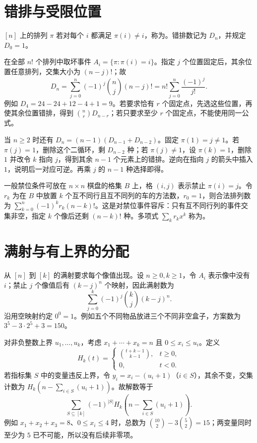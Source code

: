 \documentclass[UTF8,12pt,a4paper,fontset=fandol]{ctexbook}
\begin{document}
\section{错排与受限位置}

\begin{definition}
$[n]$ 上的排列 $\pi$ 若对每个 $i$ 都满足 $\pi(i)\ne i$，称为。错排数记为 $D_n$，并规定 $D_0=1$。
\end{definition}

在全部 $n!$ 个排列中取坏事件 $A_i=\{\pi:\pi(i)=i\}$。指定 $j$ 个位置固定后，其余位置任意排列，交集大小为 $(n-j)!$；故
\begin{equation}
  D_n=\sum_{j=0}^n(-1)^j\binom nj(n-j)!
      =n!\sum_{j=0}^n\frac{(-1)^j}{j!}.
  \label{eq:derangements}
\end{equation}
例如 $D_4=24-24+12-4+1=9$。若要求恰有 $r$ 个固定点，先选这些位置，再使其余位置错排，得到 $\binom nrD_{n-r}$；若只要求至少 $r$ 个固定点，不能使用同一公式。

当 $n\ge2$ 时还有 $D_n=(n-1)(D_{n-1}+D_{n-2})$。固定 $\pi(1)=j\ne1$。若 $\pi(j)=1$，删除这个二循环，剩 $D_{n-2}$ 种；若 $\pi(j)\ne1$，设 $\pi(k)=1$，删除 $1$ 并改令 $k$ 指向 $j$，得到其余 $n-1$ 个元素上的错排。逆向在指向 $j$ 的箭头中插入 $1$，说明后一对应可逆。再乘 $j$ 的 $n-1$ 种选择即得。

一般禁位条件可放在 $n\times n$ 棋盘的格集 $B$ 上，格 $(i,j)$ 表示禁止 $\pi(i)=j$。令 $r_k$ 为在 $B$ 中放置 $k$ 个互不同行且互不同列的车的方法数，$r_0=1$，则合法排列数为 $\sum_{k=0}^n(-1)^k r_k(n-k)!$。这是对禁位事件容斥：只有互不同行列的事件交集非空，指定 $k$ 个像后还剩 $(n-k)!$ 种。多项式 $\sum_k r_kx^k$ 称为。

\section{满射与有上界的分配}

从 $[n]$ 到 $[k]$ 的满射要求每个像值出现。设 $n\ge0,k\ge1$，令 $A_i$ 表示像中没有 $i$；禁止 $j$ 个像值后有 $(k-j)^n$ 个映射，因此满射数为
\[
  \sum_{j=0}^k(-1)^j\binom kj(k-j)^n.
\]
沿用空映射约定 $0^0=1$。例如五个不同物品放进三个不同非空盒子，方案数为 $3^5-3\cdot2^5+3=150$。

对非负整数上界 $u_1,\ldots,u_k$，考虑 $x_1+\cdots+x_k=n$ 且 $0\le x_i\le u_i$。定义
\[
  H_k(t)=\begin{cases}\binom{t+k-1}{k-1},&t\ge0,\\0,&t<0.\end{cases}
\]
若指标集 $S$ 中的变量违反上界，令 $y_i=x_i-(u_i+1)$（$i\in S$），其余不变，交集计数为 $H_k(n-\sum_{i\in S}(u_i+1))$。故解数等于
\begin{equation}
  \sum_{S\subseteq[k]}(-1)^{|S|}
  H_k\left(n-\sum_{i\in S}(u_i+1)\right).
  \label{eq:bounded-compositions}
\end{equation}
例如 $x_1+x_2+x_3=8$、$0\le x_i\le4$ 时，总数为 $\binom{10}{2}-3\binom52=15$；两变量同时至少为 $5$ 已不可能，所以没有后续非零项。
\end{document}
